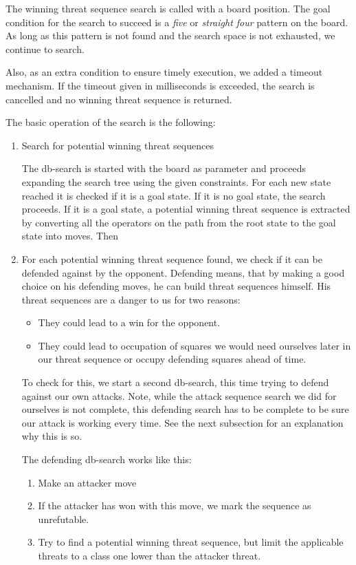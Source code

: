 \documentclass[10pt]{article}
\begin{document}
The winning threat sequence search is called with a board position.  The goal
condition for the search to succeed is a {\em five} or {\em straight four}
pattern on the board.  As long as this pattern is not found and the search
space is not exhausted, we continue to search.

Also, as an extra condition to ensure timely execution, we added a timeout
mechanism.  If the timeout given in milliseconds is exceeded, the search is
cancelled and no winning threat sequence is returned.

The basic operation of the search is the following:

\begin{enumerate}
\item Search for potential winning threat sequences

The db-search is started with the board as parameter and proceeds expanding
the search tree using the given constraints.  For each new state reached it is
checked if it is a goal state.  If it is no goal state, the search proceeds.
If it is a goal state, a potential winning threat sequence is extracted by
converting all the operators on the path from the root state to the goal state
into moves.  Then

\item For each potential winning threat sequence found, we check if it can be
defended against by the opponent.  Defending means, that by making a good
choice on his defending moves, he can build threat sequences himself.  His
threat sequences are a danger to us for two reasons:
\begin{itemize}
	\item They could lead to a win for the opponent.
	\item They could lead to occupation of squares we would need ourselves
later in our threat sequence or occupy defending squares ahead of time.
\end{itemize}

To check for this, we start a second db-search, this time trying to defend
against our own attacks.  Note, while the attack sequence search we did for
ourselves is not complete, this defending search has to be complete to be sure
our attack is working every time.  See the next subsection for an explanation
why this is so.

The defending db-search works like this:
\begin{enumerate}
	\item Make an attacker move
	\item If the attacker has won with this move, we mark the sequence as
unrefutable.
	\item Try to find a potential winning threat sequence, but limit the
applicable threats to a class one lower than the attacker threat.


\end{enumerate}
\end{enumerate}
\end{document}
